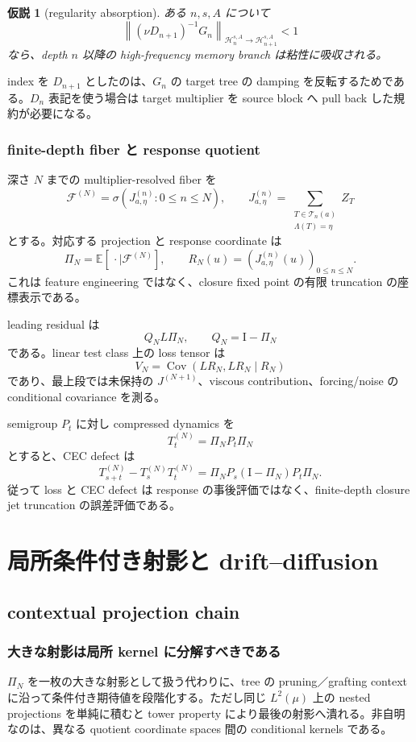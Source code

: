 \documentclass[11pt,a4paper,openany]{book}
\newtheorem{hypothesis}[definition]{仮説}
\numberwithin{equation}{chapter}
\newcommand{\E}{\mathbb E}
\newcommand{\Cov}{\operatorname{Cov}}
\newcommand{\cF}{\mathcal F}
\newcommand{\cH}{\mathcal H}
\newcommand{\cT}{\mathcal T}
\newcommand{\Id}{\mathrm I}
\newcommand{\norm}[1]{\left\lVert #1\right\rVert}
\begin{document}
\begin{hypothesis}[regularity absorption]
ある $n,s,A$ について
\[
\norm{(\nu D_{n+1})^{-1}G_n}_{\cH_n^{s,A}\to\cH_{n+1}^{s,A}}<1
\]
なら、depth $n$ 以降の high-frequency memory branch は粘性に吸収される。
\end{hypothesis}

index を $D_{n+1}$ としたのは、$G_n$ の target tree の damping を反転するためである。$D_n$ 表記を使う場合は target multiplier を source block へ pull back した規約が必要になる。

\section{finite-depth fiber と response quotient}
深さ $N$ までの multiplier-resolved fiber を
\[
\cF^{(N)}
=\sigma\left(J_{a,\eta}^{(n)}:0\le n\le N\right),
\qquad
J_{a,\eta}^{(n)}
=\sum_{\substack{T\in\cT_n(a)\\\Lambda(T)=\eta}}Z_T
\]
とする。対応する projection と response coordinate は
\[
\Pi_N=\E[\,\cdot\mid\cF^{(N)}],
\qquad
R_N(u)=\left(J_{a,\eta}^{(n)}(u)\right)_{0\le n\le N}.
\]
これは feature engineering ではなく、closure fixed point の有限 truncation の座標表示である。

leading residual は
\[
Q_NL\Pi_N,
\qquad Q_N=\Id-\Pi_N
\]
である。linear test class 上の loss tensor は
\[
V_N
=\Cov(LR_N,LR_N\mid R_N)
\]
であり、最上段では未保持の $J^{(N+1)}$、viscous contribution、forcing/noise の conditional covariance を測る。

semigroup $P_t$ に対し compressed dynamics を
\[
T_t^{(N)}=\Pi_NP_t\Pi_N
\]
とすると、CEC defect は
\[
T_{s+t}^{(N)}-T_s^{(N)}T_t^{(N)}
=\Pi_NP_s(\Id-\Pi_N)P_t\Pi_N.
\]
従って loss と CEC defect は response の事後評価ではなく、finite-depth closure jet truncation の誤差評価である。

\part{局所条件付き射影と drift--diffusion}

\chapter{contextual projection chain}
\section{大きな射影は局所 kernel に分解すべきである}
$\Pi_N$ を一枚の大きな射影として扱う代わりに、tree の pruning／grafting context に沿って条件付き期待値を段階化する。ただし同じ $L^2(\mu)$ 上の nested projections を単純に積むと tower property により最後の射影へ潰れる。非自明なのは、異なる quotient coordinate spaces 間の conditional kernels である。
\end{document}
